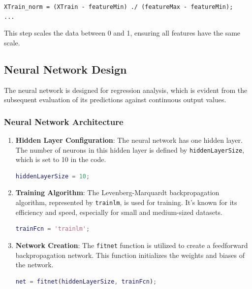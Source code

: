 \begin{lstlisting}
XTrain_norm = (XTrain - featureMin) ./ (featureMax - featureMin);
...
\end{lstlisting}

This step scales the data between 0 and 1, ensuring all features have the same scale\cite{neuralnet}.

\subsection{Neural Network Design}

The neural network is designed for regression analysis, which is evident from the subsequent evaluation of its predictions against continuous output values.

\subsubsection{Neural Network Architecture}
\begin{enumerate}
    \item \textbf{Hidden Layer Configuration}: The neural network has one hidden layer. The number of neurons in this hidden layer is defined by \texttt{hiddenLayerSize}, which is set to 10 in the code.

    \begin{lstlisting}[language=Matlab]
    hiddenLayerSize = 10;
    \end{lstlisting}

    \item \textbf{Training Algorithm}: The Levenberg-Marquardt backpropagation algorithm, represented by \texttt{trainlm}, is used for training. It's known for its efficiency and speed, especially for small and medium-sized datasets.

    \begin{lstlisting}[language=Matlab]
    trainFcn = 'trainlm';
    \end{lstlisting}

    \item \textbf{Network Creation}: The \texttt{fitnet} function is utilized to create a feedforward backpropagation network. This function initializes the weights and biases of the network.

    \begin{lstlisting}[language=Matlab]
    net = fitnet(hiddenLayerSize, trainFcn);
    \end{lstlisting}
\end{enumerate}

